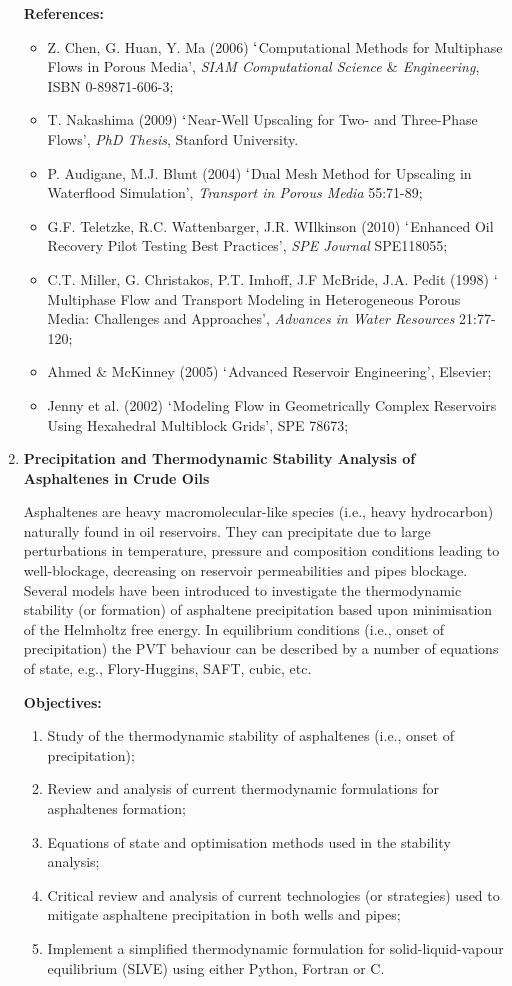 \documentclass[12pts,a4paper,amsmath,amssymb,floatfix]{article}%
\begin{document}
\begin{enumerate}[label=\bfseries Project: \arabic*:]
\noindent
{\bf References:}
\begin{itemize}
\item Z. Chen, G. Huan, Y. Ma (2006) $\lq$Computational Methods for Multiphase Flows in Porous Media', {\it SIAM Computational Science $\&$ Engineering}, ISBN 0-89871-606-3;
\item T. Nakashima (2009) $\lq$Near-Well Upscaling for Two- and Three-Phase Flows', {\it PhD Thesis}, Stanford University.
\item P. Audigane, M.J. Blunt (2004) $\lq$Dual Mesh Method for Upscaling in Waterflood Simulation', {\it Transport in Porous Media} 55:71-89;
\item G.F. Teletzke, R.C. Wattenbarger, J.R. WIlkinson (2010) $\lq$Enhanced Oil Recovery Pilot Testing Best Practices', {\it SPE Journal} SPE118055;
\item C.T. Miller, G. Christakos, P.T. Imhoff, J.F McBride, J.A. Pedit (1998) $\lq$Multiphase Flow and Transport Modeling in Heterogeneous Porous Media: Challenges and Approaches', {\it Advances in Water Resources} 21:77-120;
\item  Ahmed $\&$ McKinney (2005) $\lq$Advanced Reservoir Engineering’, Elsevier;
\item Jenny et al. (2002) $\lq$Modeling Flow in Geometrically Complex Reservoirs Using Hexahedral Multiblock Grids’, SPE 78673;
\end{itemize}


\clearpage
\item {\bf Precipitation and Thermodynamic Stability Analysis of Asphaltenes in Crude Oils}

Asphaltenes are heavy macromolecular-like species (i.e., heavy hydrocarbon) naturally found in oil reservoirs. They can precipitate due to large perturbations in temperature, pressure and composition conditions leading to well-blockage, decreasing on reservoir permeabilities and pipes blockage. Several models have been introduced to investigate the thermodynamic stability (or formation) of asphaltene precipitation based upon minimisation of the Helmholtz free energy. In equilibrium conditions (i.e., onset of precipitation) the PVT behaviour can be described by a number of equations of state, e.g., Flory-Huggins, SAFT, cubic, etc. 

\noindent
{\bf Objectives:}
\begin{enumerate}
\item Study of the thermodynamic stability of asphaltenes (i.e., onset of precipitation); 
\item Review and analysis of current thermodynamic formulations for asphaltenes formation; 
\item Equations of state and optimisation methods used in the stability analysis; 
\item Critical review and analysis of current technologies (or strategies) used to mitigate asphaltene precipitation in both wells and pipes;
\item Implement a simplified thermodynamic formulation for solid-liquid-vapour equilibrium (SLVE) using either Python, Fortran or C.
\end{enumerate} 
 

\end{enumerate}
\end{document}
